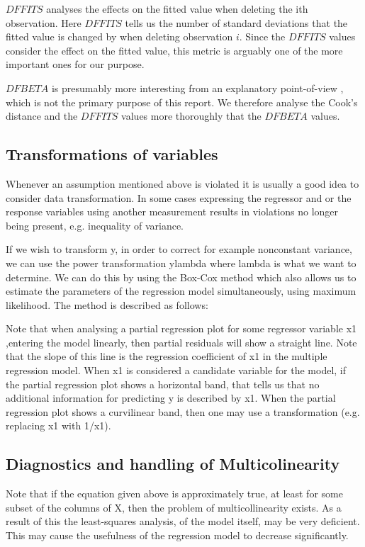 \documentclass[11pt]{article}
\begin{document}
\(DFFITS\) analyses the effects on the fitted value when deleting the ith observation. Here \(DFFITS\) tells us
the number of standard deviations that the fitted value is changed by when deleting observation \(i\). Since 
the \(DFFITS\) values consider the effect on the fitted value, this metric is arguably one of the more important 
ones for our purpose.

\(DFBETA\) is presumably more interesting from an explanatory point-of-view \cite{22286}, which is not the
primary purpose of this report. We therefore analyse the Cook's distance and the \(DFFITS\) values more
thoroughly that the \(DFBETA\) values.

\subsection{Transformations of variables}
\label{sec:org9906d91}

Whenever an assumption mentioned above is violated it is usually a good idea to consider data transformation. 
In some cases expressing the regressor and or the response variables using another measurement results in 
violations no longer being present, e.g. inequality of variance. 

If we wish to transform y, in order to correct for example nonconstant variance, we can use the power
transformation ylambda where lambda is what we want to determine. We can do this by using the Box-Cox method
which also allows us to estimate the parameters of the regression model simultaneously, using maximum likelihood.
The method is described as follows:

Note that when analysing a partial regression plot for some regressor variable x1 ,entering the model linearly, 
then partial residuals will show a straight line. Note that the slope of this line is the regression coefficient 
of x1 in the multiple regression model. When x1 is considered a candidate variable for the model, if the partial
regression plot shows a horizontal band, that tells us that no additional information for predicting y is 
described by x1. When the partial regression plot shows a curvilinear band, then one may use a transformation 
(e.g. replacing x1 with 1/x1).

\subsection{Diagnostics and handling of Multicolinearity}
\label{sec:org6a27468}

Note that if the equation given above is approximately true, at least for some subset of the columns of X,
then the problem of multicollinearity exists. As a result of this the least-squares analysis, of the model
itself, may be very deficient. This may cause the usefulness of the regression model to decrease significantly. 
\end{document}
